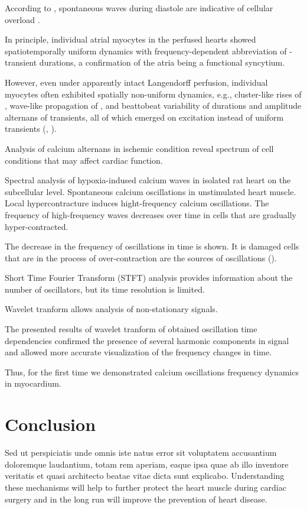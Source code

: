 \documentclass{biophys-new}
\begin{document}
According to \cite{macquaide2007measurement}, spontaneous  waves during diastole are indicative of cellular  overload .

In principle, individual atrial myocytes in the perfused hearts showed spatiotemporally uniform  dynamics with frequency-dependent abbreviation of -transient durations,
a confirmation of the atria being a functional syncytium.

However, even under apparently intact Langendorff perfusion,
individual myocytes often exhibited spatially non-uniform  dynamics,
e.g., cluster-like rises of , wave-like propagation of ,
and beattobeat variability of durations and amplitude alternans of  transients, all of which emerged on excitation instead of uniform  transients (\cite{jiang2014pacing}, \cite{aguirre2014intravital}).

Analysis of calcium alternans in ischemic condition reveal spectrum of cell conditions that may affect cardiac function.

Spectral analysis of hypoxia-indused calcium waves in isolated rat heart on the subcellular level.
Spontaneous calcium oscillations in unstimulated heart muscle.
Local hypercontracture induces hight-frequency calcium oscillations.
The frequency of high-frequency waves decreases over time in cells that are gradually hyper-contracted.

The decrease in the frequency of oscillations in time is shown.
It is damaged cells that are in the process of over-contraction
are the sources of oscillations (\cite{sato2014depolarization}).

Short Time Fourier Transform (STFT) analysis provides information about the number of oscillators, but its time resolution is limited.

Wavelet tranform allows analysis of non-stationary signals.

The presented results of wavelet tranform of obtained oscillation time dependencies confirmed the presence of several harmonic components in signal
and allowed more accurate visualization of the frequency changes in time.

Thus, for the first time we demonstrated calcium oscillations frequency dynamics in myocardium.

\section*{Conclusion}
Sed ut perspiciatis unde omnis iste natus error sit voluptatem accusantium doloremque laudantium, totam rem aperiam, eaque ipsa quae ab illo inventore veritatis et quasi architecto beatae vitae dicta sunt explicabo.
Understanding these mechanisms will help to further protect the heart muscle during cardiac surgery and in the long run will improve the prevention of heart disease.
\end{document}
